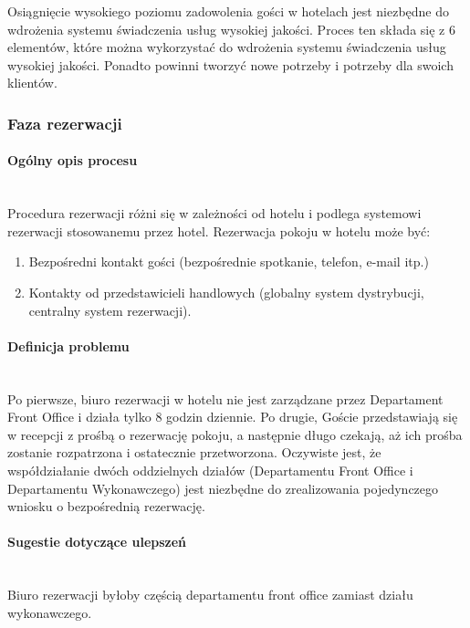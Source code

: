 \documentclass[a4paper, 12pt]{article}
\begin{document}
Osiągnięcie wysokiego poziomu zadowolenia gości w hotelach jest niezbędne do wdrożenia systemu świadczenia usług wysokiej jakości. Proces ten składa się z 6 elementów, które można wykorzystać do wdrożenia systemu świadczenia usług wysokiej jakości. Ponadto powinni tworzyć nowe potrzeby i potrzeby dla swoich klientów.
\subsubsection{Faza rezerwacji}
\paragraph{Ogólny opis procesu}\mbox{}\\
Procedura rezerwacji różni się w zależności od hotelu i podlega systemowi rezerwacji stosowanemu przez hotel. Rezerwacja pokoju w hotelu może być:
\begin{enumerate}
	\item Bezpośredni kontakt gości (bezpośrednie spotkanie, telefon, e-mail itp.)
	\item Kontakty od przedstawicieli handlowych (globalny system dystrybucji, centralny system rezerwacji).
\end{enumerate}
\paragraph{Definicja problemu}\mbox{}\\
Po pierwsze, biuro rezerwacji w hotelu nie jest zarządzane przez Departament Front Office i działa tylko 8 godzin dziennie. Po drugie, Goście przedstawiają się w recepcji z prośbą o rezerwację pokoju, a następnie długo czekają, aż ich prośba zostanie rozpatrzona i ostatecznie przetworzona. Oczywiste jest, że współdziałanie dwóch oddzielnych działów (Departamentu Front Office i Departamentu Wykonawczego) jest niezbędne do zrealizowania pojedynczego wniosku o bezpośrednią rezerwację.
\paragraph{Sugestie dotyczące ulepszeń}\mbox{}\\
Biuro rezerwacji byłoby częścią departamentu front office zamiast działu wykonawczego.
\end{document}
